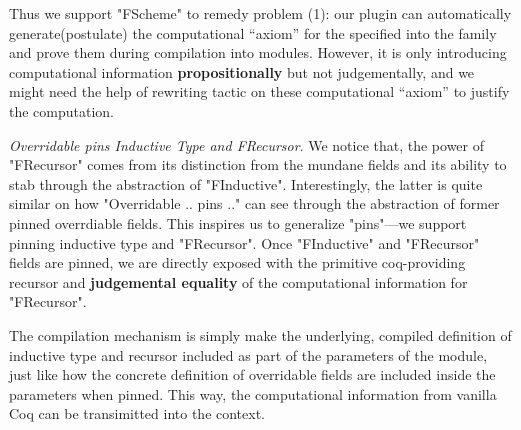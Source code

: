 
Thus we support "FScheme" to remedy problem (1): our plugin can automatically generate(postulate) the computational ``axiom'' for the specified  into the family and prove them during compilation into modules. However, it is only introducing computational information \textbf{propositionally} but not judgementally, and we might need the help of rewriting tactic on these computational ``axiom'' to justify the computation. 




\textit{Overridable pins Inductive Type and FRecursor}. We notice that, the power of "FRecursor" comes from its distinction from the mundane fields and its ability to stab through the abstraction of "FInductive". Interestingly, the latter is quite similar on how "Overridable .. pins {..}" can see through the abstraction of former pinned overrdiable fields. This inspires us to generalize "pins"---we support pinning inductive type and "FRecursor". Once "FInductive" and "FRecursor" fields are pinned, we are directly exposed with the primitive coq-providing recursor and \textbf{judgemental equality} of the computational information for "FRecursor". 

The compilation mechanism is simply make the underlying, compiled definition of inductive type and recursor included as part of the parameters of the module, just like how the concrete definition of overridable fields are included inside the parameters when pinned. This way, the computational information from vanilla Coq can be transimitted into the context.  


